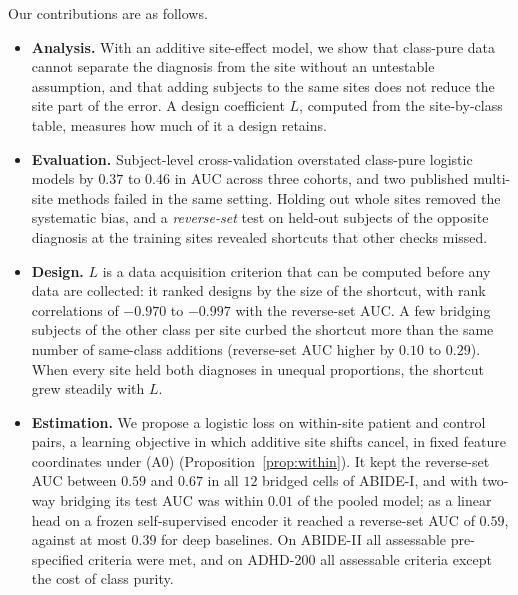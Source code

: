 Our contributions are as follows.
\begin{itemize}
\item \textbf{Analysis.} With an additive site-effect model, we show that class-pure data cannot separate the diagnosis from the site without an untestable assumption, and that adding subjects to the same sites does not reduce the site part of the error. A design coefficient $L$, computed from the site-by-class table, measures how much of it a design retains.
\item \textbf{Evaluation.} Subject-level cross-validation overstated class-pure logistic models by $0.37$ to $0.46$ in AUC across three cohorts, and two published multi-site methods failed in the same setting. Holding out whole sites removed the systematic bias, and a \emph{reverse-set} test on held-out subjects of the opposite diagnosis at the training sites revealed shortcuts that other checks missed.
\item \textbf{Design.} $L$ is a data acquisition criterion that can be computed before any data are collected: it ranked designs by the size of the shortcut, with rank correlations of $-0.970$ to $-0.997$ with the reverse-set AUC. A few bridging subjects of the other class per site curbed the shortcut more than the same number of same-class additions (reverse-set AUC higher by $0.10$ to $0.29$). When every site held both diagnoses in unequal proportions, the shortcut grew steadily with $L$.
\item \textbf{Estimation.} We propose a logistic loss on within-site patient and control pairs, a learning objective in which additive site shifts cancel, in fixed feature coordinates under (A0) (Proposition~\ref{prop:within}). It kept the reverse-set AUC between $0.59$ and $0.67$ in all $12$ bridged cells of ABIDE-I, and with two-way bridging its test AUC was within $0.01$ of the pooled model; as a linear head on a frozen self-supervised encoder it reached a reverse-set AUC of $0.59$, against at most $0.39$ for deep baselines. On ABIDE-II all assessable pre-specified criteria were met, and on ADHD-200 all assessable criteria except the cost of class purity.
\end{itemize}
